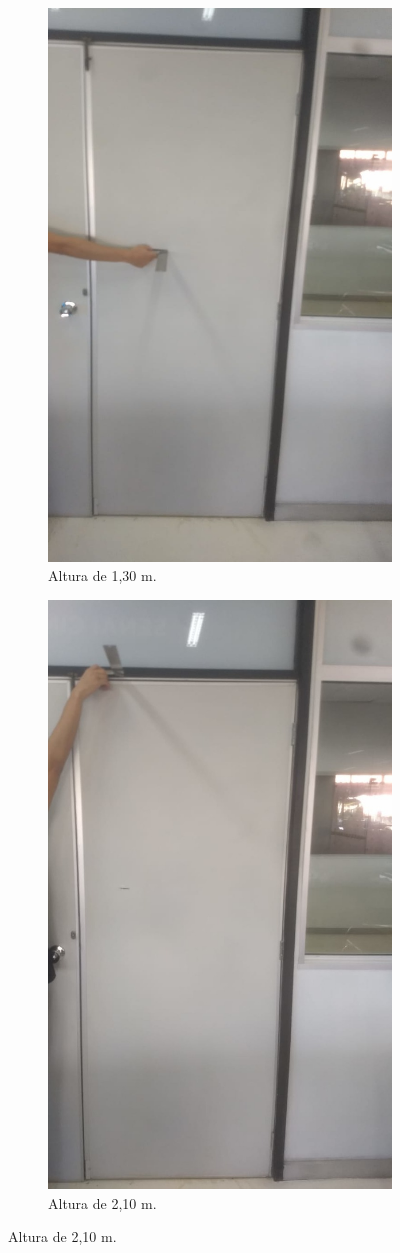 \begin{figure}[t!]
  \caption{Ambiente de realização do experimento.}
  \begin{subfigure}{0.5\textwidth}
    \includegraphics[width=0.9\linewidth]{images/altura130cm.jpg} 
    \caption{Altura de 1,30 m.}
  \end{subfigure}
  \begin{subfigure}{0.5\textwidth}
    \includegraphics[width=0.9\linewidth, height = 10.75 cm]{images/altura210cm.jpg}
    \caption{Altura de 2,10 m.}
  \end{subfigure}
    \label{fig:amb}
\end{figure}